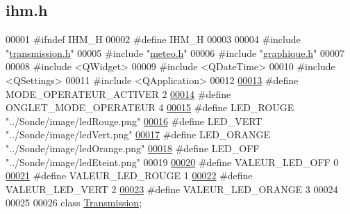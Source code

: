 \hypertarget{ihm_8h_source}{}\subsection{ihm.\+h}
\label{ihm_8h_source}

\begin{DoxyCode}
00001 \textcolor{preprocessor}{#ifndef IHM\_H}
00002 \textcolor{preprocessor}{#define IHM\_H}
00003 
00004 \textcolor{preprocessor}{#include "\hyperlink{transmission_8h}{transmission.h}"}
00005 \textcolor{preprocessor}{#include "\hyperlink{meteo_8h}{meteo.h}"}
00006 \textcolor{preprocessor}{#include "\hyperlink{graphique_8h}{graphique.h}"}
00007 
00008 \textcolor{preprocessor}{#include <QWidget>}
00009 \textcolor{preprocessor}{#include <QDateTime>}
00010 \textcolor{preprocessor}{#include <QSettings>}
00011 \textcolor{preprocessor}{#include <QApplication>}
00012 
\hypertarget{ihm_8h_source.tex_l00013}{}\hyperlink{ihm_8h_a6a76d185be61af9a67ee12297edb0025}{00013} \textcolor{preprocessor}{#define MODE\_OPERATEUR\_ACTIVER 2}
\hypertarget{ihm_8h_source.tex_l00014}{}\hyperlink{ihm_8h_a467f42462a8692cc6e1027a51c725759}{00014} \textcolor{preprocessor}{#define ONGLET\_MODE\_OPERATEUR 4}
\hypertarget{ihm_8h_source.tex_l00015}{}\hyperlink{ihm_8h_a37c6676a5b82b283c556ba9a35d8ad8d}{00015} \textcolor{preprocessor}{#define LED\_ROUGE "../Sonde/image/ledRouge.png"}
\hypertarget{ihm_8h_source.tex_l00016}{}\hyperlink{ihm_8h_ae96e1dcc18e953ab066891dcb822ec71}{00016} \textcolor{preprocessor}{#define LED\_VERT "../Sonde/image/ledVert.png"}
\hypertarget{ihm_8h_source.tex_l00017}{}\hyperlink{ihm_8h_a4d9260fdff3b0a796816640bbac505cc}{00017} \textcolor{preprocessor}{#define LED\_ORANGE "../Sonde/image/ledOrange.png"}
\hypertarget{ihm_8h_source.tex_l00018}{}\hyperlink{ihm_8h_a80700bb63bd56ebabbb4728aa433fd29}{00018} \textcolor{preprocessor}{#define LED\_OFF "../Sonde/image/ledEteint.png"}
00019 
\hypertarget{ihm_8h_source.tex_l00020}{}\hyperlink{ihm_8h_a51cc9c67b26515b9fe244dd1d583a7b8}{00020} \textcolor{preprocessor}{#define VALEUR\_LED\_OFF 0}
\hypertarget{ihm_8h_source.tex_l00021}{}\hyperlink{ihm_8h_a463267e2444f17d868aadaf532385f29}{00021} \textcolor{preprocessor}{#define VALEUR\_LED\_ROUGE 1}
\hypertarget{ihm_8h_source.tex_l00022}{}\hyperlink{ihm_8h_ab5894fc14244d3bab5a2a702b15ef745}{00022} \textcolor{preprocessor}{#define VALEUR\_LED\_VERT 2}
\hypertarget{ihm_8h_source.tex_l00023}{}\hyperlink{ihm_8h_a96cded5b4a0179b8773dc8caec0c7bec}{00023} \textcolor{preprocessor}{#define VALEUR\_LED\_ORANGE 3}
00024 
00025 
00026 \textcolor{keyword}{class }\hyperlink{class_transmission}{Transmission};

\end{DoxyCode}
